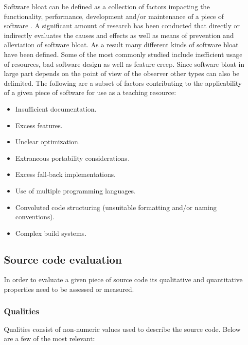 Software bloat can be defined as a collection of factors impacting the functionality, performance, development and/or maintenance of a piece of software \cite{McGrenere2000AreWA,McGrenere2000BloatTO,Quach2018DebloatingST,Quach2019BloatFA}. A significant amount of research has been conducted that directly or indirectly evaluates the causes \cite{Mitchell2010FourTL} and effects \cite{Quach2019BloatFA} as well as means of prevention \cite{Pike2007ProgramDI,Milicchio2007TheUK} and alleviation \cite{Quach2018DebloatingST} of software bloat. As a result many different kinds of software bloat have been defined. Some of the most commonly studied include inefficient usage of resources, bad software design as well as feature creep. Since software bloat in large part depends on the point of view of the observer other types can also be delimited. The following are a subset of factors contributing to the applicability of a given piece of software for use as a teaching resource:

\begin{itemize}
    \item Insufficient documentation.
    \item Excess features.
    \item Unclear optimization.
    \item Extraneous portability considerations.
    \item Excess fall-back implementations.
    \item Use of multiple programming languages.
    \item Convoluted code structuring (unsuitable formatting and/or naming conventions).
    \item Complex build systems.
\end{itemize}

\subsection{Source code evaluation}

In order to evaluate a given piece of source code its qualitative and quantitative properties need to be assessed or measured. 

\subsubsection{Qualities}

Qualities consist of non-numeric values used to describe the source code. Below are a few of the most relevant:

